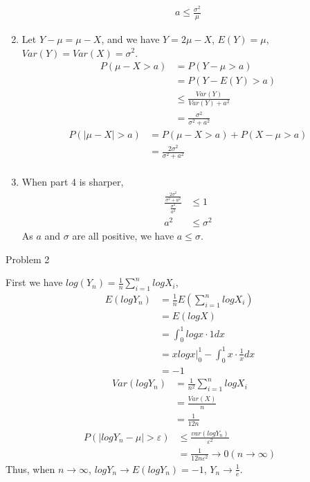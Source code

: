\documentclass[12pt,letterpaper, onecolumn]{exam}
\begin{document}
\begin{questions}
\begin{solution}
\begin{enumerate}
\begin{align*}
            a \leq \frac{\sigma^2}{\mu}
        \end{align*}
        \item Let $Y-\mu = \mu-X$, and we have $Y = 2\mu-X$, $E(Y) = \mu$, $Var(Y) = Var(X) = \sigma^2$.        
        \begin{align*}
            P (\mu-X >a) & = P(Y-\mu>a) \\
            & = P(Y-E(Y)>a) \\
            & \leq \frac{Var(Y)}{Var(Y)+a^2} \\
            & = \frac{\sigma^2}{\sigma^2+a^2}
        \end{align*}
        \begin{align*}
            P(|\mu-X|>a) & = P(\mu-X>a) + P(X-\mu>a) \\
            & = \frac{2\sigma^2}{\sigma^2+a^2}\\
        \end{align*}
        \item When part 4 is sharper,
        \begin{align*}
                \frac{\frac{2\sigma^2}{\sigma^2+a^2}}{\frac{\sigma^2}{a^2}} & \leq 1 \\
                a^2 & \leq \sigma^2
        \end{align*}
    As $a$ and $\sigma$ are all positive, we have $a \leq \sigma$.
    \end{enumerate}
    \end{solution}

    \question Problem 2
    \begin{solution}
        First we have $log(Y_n) = \frac{1}{n}\sum_{i=1}^n logX_i$,  \begin{align*}
            E(logY_n) & = \frac{1}{n}E(\sum_{i=1}^n logX_i) \\
            & = E(logX) \\
            & = \int_0^1 logx \cdot 1 dx \\
            & = xlogx |_0^1- \int_0^1 x\cdot \frac{1}{x}dx \\ 
            & = -1
        \end{align*}
        \begin{align*}
            Var(logY_n)& = \frac{1}{n^2}\sum_{i=1}^n logX_i \\
            & = \frac{Var(X)}{n} \\
            & = \frac{1}{12n}
        \end{align*}
        \begin{align*}
            P(|logY_n-\mu| > \varepsilon ) & \leq \frac{var(logY_n)}{\varepsilon^2} \\
            & = \frac{1}{12n\varepsilon^2} \rightarrow 0 ( n\rightarrow\infty)
        \end{align*}
        Thus, when $n \rightarrow \infty$, $logY_n \rightarrow E(logY_n) = -1$, $Y_n \rightarrow \frac{1}{e}$.
    \end{solution}
    

\end{questions}
\end{document}
